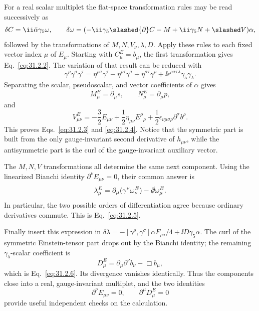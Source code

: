 \ExerciseEditorialNote

\begin{enumerate}
  For a real scalar multiplet the flat-space transformation rules may be
  read successively as
  \[
    \delta C=\ii\bar\alpha\gamma _5\omega,\qquad
    \delta\omega=
    (-\ii\gamma _5\slashed{\partial}C-M+\ii\gamma _5N+\slashed V)\alpha ,
  \]
  followed by the transformations of \(M,N,V_\nu,\lambda,D\).  Apply
  these rules to each fixed vector index \(\mu\) of \(E_\mu\).  Starting
  with \(C_\mu^E=b_\mu\), the first transformation gives
  Eq.~\eqref{eq:31.2.2}.  The variation of that result can be reduced with
  \[
    \gamma^\rho\gamma^\sigma\gamma^\tau
    =\eta^{\rho\sigma}\gamma^\tau-\eta^{\rho\tau}\gamma^\sigma
     +\eta^{\sigma\tau}\gamma^\rho
     +\ii\epsilon^{\rho\sigma\tau\lambda}\gamma _5\gamma_\lambda .
  \]
  Separating the scalar, pseudoscalar, and vector coefficients of
  \(\alpha\) gives
  \[
    M_\mu^E=\partial_\mu s,\qquad
    N_\mu^E=\partial_\mu p,
  \]
  and
  \[
    V_{\mu\nu}^E
      =-\frac32E_{\mu\nu}
       +\frac12\eta_{\mu\nu}E^\rho{}_\rho
       +\frac12\epsilon_{\nu\mu\sigma\rho}
          \partial^\sigma b^\rho .
  \]
  This proves Eqs.~\eqref{eq:31.2.3} and \eqref{eq:31.2.4}.  Notice that
  the symmetric part is built from the only gauge-invariant second
  derivative of \(h_{\mu\nu}\), while the antisymmetric part is the curl
  of the gauge-invariant auxiliary vector.

  The \(M,N,V\) transformations all determine the same next component.
  Using the linearized Bianchi identity
  \(\partial^\nu E_{\mu\nu}=0\), their common answer is
  \[
    \lambda_\mu^E
      =\partial_\mu(\gamma^\nu\omega_\nu^E)
       -\slashed{\partial}\omega_\mu^E .
  \]
  In particular, the two possible orders of differentiation agree
  because ordinary derivatives commute.  This is
  Eq.~\eqref{eq:31.2.5}.

  Finally insert this expression in
  \(\delta\lambda=-[\gamma^\rho,\gamma^\sigma]\alpha
  F_{\rho\sigma}/4+\ii D\gamma _5\alpha\).  The curl of the symmetric
  Einstein-tensor part drops out by the Bianchi identity; the remaining
  \(\gamma _5\)-scalar coefficient is
  \[
    D_\mu^E=\partial_\mu\partial^\nu b_\nu-\Box b_\mu ,
  \]
  which is Eq.~\eqref{eq:31.2.6}.  Its divergence vanishes identically.
  Thus the components close into a real, gauge-invariant multiplet, and
  the two identities
  \[
    \partial^\nu E_{\mu\nu}=0,\qquad
    \partial^\mu D_\mu^E=0
  \]
  provide useful independent checks on the calculation.


\end{enumerate}
